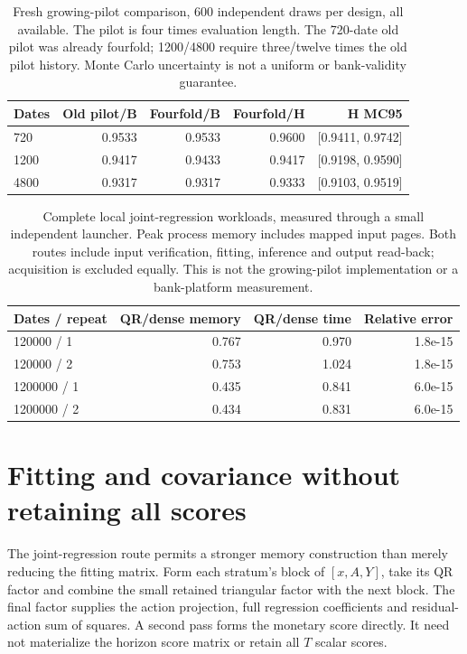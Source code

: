 \begin{table}[htbp]\centering\small
\begin{tabular}{lrrrr}
\toprule
Dates & Old pilot/B & Fourfold/B & Fourfold/H & H MC95\\\midrule
720 & 0.9533 & 0.9533 & 0.9600 & [0.9411, 0.9742]\\
1200 & 0.9417 & 0.9433 & 0.9417 & [0.9198, 0.9590]\\
4800 & 0.9317 & 0.9317 & 0.9333 & [0.9103, 0.9519]\\
\bottomrule\end{tabular}
\caption{Fresh growing-pilot comparison, 600 independent draws per design, all available. The pilot is four times evaluation length. The 720-date old pilot was already fourfold; 1200/4800 require three/twelve times the old pilot history. Monte Carlo uncertainty is not a uniform or bank-validity guarantee.}
\label{v9:followup-table}
\end{table}

\begin{table}[htbp]\centering\small
\begin{tabular}{lrrr}
\toprule
Dates / repeat & QR/dense memory & QR/dense time & Relative error\\\midrule
120000 / 1 & 0.767 & 0.970 & 1.8e-15\\
120000 / 2 & 0.753 & 1.024 & 1.8e-15\\
1200000 / 1 & 0.435 & 0.841 & 6.0e-15\\
1200000 / 2 & 0.434 & 0.831 & 6.0e-15\\
\bottomrule\end{tabular}
\caption{Complete local joint-regression workloads, measured through a small independent launcher. Peak process memory includes mapped input pages. Both routes include input verification, fitting, inference and output read-back; acquisition is excluded equally. This is not the growing-pilot implementation or a bank-platform measurement.}
\label{v9:workload-table}
\end{table}




\section{Fitting and covariance without retaining all scores}
\label{v9:execution}

The joint-regression route permits a stronger memory construction than merely
reducing the fitting matrix. Form each stratum's block of $[x,A,Y]$, take its QR
factor and combine the small retained triangular factor with the next block.
The final factor supplies the action projection, full regression coefficients
and residual-action sum of squares. A second pass forms the monetary score
directly. It need not materialize the horizon score matrix or retain all $T$
scalar scores.

